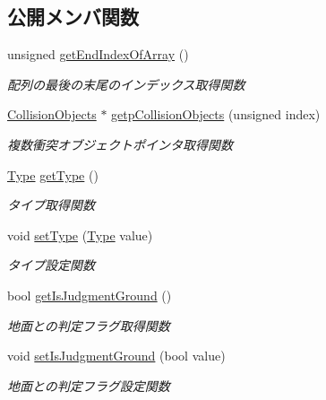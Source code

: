 \subsection*{公開メンバ関数}
\begin{DoxyCompactItemize}
\item 
unsigned \mbox{\hyperlink{class_collision_base_ac1d7000c820fabfa604138cda30a40a1}{get\+End\+Index\+Of\+Array}} ()
\begin{DoxyCompactList}\small\item\em 配列の最後の末尾のインデックス取得関数 \end{DoxyCompactList}\item 
\mbox{\hyperlink{class_collision_objects}{Collision\+Objects}} $\ast$ \mbox{\hyperlink{class_collision_base_a2b0a626608545c202ef89d859b3d47b7}{getp\+Collision\+Objects}} (unsigned index)
\begin{DoxyCompactList}\small\item\em 複数衝突オブジェクトポインタ取得関数 \end{DoxyCompactList}\item 
\mbox{\hyperlink{class_collision_base_a18dc0d5461742083ca12013fe9ff1a20}{Type}} \mbox{\hyperlink{class_collision_base_a9ab6ff88dc0379278229342d4e016744}{get\+Type}} ()
\begin{DoxyCompactList}\small\item\em タイプ取得関数 \end{DoxyCompactList}\item 
void \mbox{\hyperlink{class_collision_base_ada12dae7057600b363751efa910050f4}{set\+Type}} (\mbox{\hyperlink{class_collision_base_a18dc0d5461742083ca12013fe9ff1a20}{Type}} value)
\begin{DoxyCompactList}\small\item\em タイプ設定関数 \end{DoxyCompactList}\item 
bool \mbox{\hyperlink{class_collision_base_a7b9cd927976308f8719f3becc03b99a1}{get\+Is\+Judgment\+Ground}} ()
\begin{DoxyCompactList}\small\item\em 地面との判定フラグ取得関数 \end{DoxyCompactList}\item 
void \mbox{\hyperlink{class_collision_base_a231cb5c715701444db63db030c06b694}{set\+Is\+Judgment\+Ground}} (bool value)
\begin{DoxyCompactList}\small\item\em 地面との判定フラグ設定関数 \end{DoxyCompactList}\item 

\end{DoxyCompactItemize}
